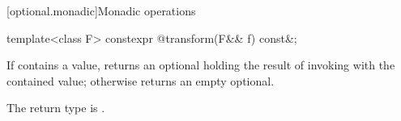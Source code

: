 [optional.monadic]{Monadic operations}

%
\begin{itemdecl}
template<class F>
  constexpr @\seebelow@ transform(F&& f) const&;
\end{itemdecl}

\begin{itemdescr}
\pnum
\effects
If  contains a value, returns an optional holding the result of invoking  with the contained value; otherwise returns an empty optional.

\pnum
\remarks
The return type is .
\end{itemdescr}
